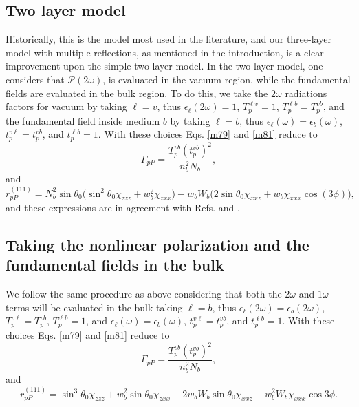 

\subsection{Two layer model}\label{sec:2layer}

Historically, this is the model most used in the literature, and our three-layer
model with multiple reflections, as mentioned in the introduction, is a clear
improvement upon the simple two layer model. In the two layer model, one
considers that $\boldsymbol{\mathcal{P}}(2\omega)$, is evaluated in the vacuum
region, while the fundamental fields are evaluated in the bulk
region.\cite{sipePRB87, mizrahiJOSA88} To do this, we take the $2\omega$
radiations factors for vacuum by taking $\ell=v$, thus
$\epsilon_{\ell}(2\omega)=1$, $T^{\ell v}_{p}=1$, $T^{\ell b}_{p} = T^{vb}_{p}$,
and the fundamental field inside medium $b$ by taking $\ell=b$, thus
$\epsilon_{\ell}(\omega)=\epsilon_{b}(\omega)$, $t^{v\ell}_{p}=t^{vb}_{p}$, and
$t^{\ell b}_{p}=1$. With these choices Eqs. \eqref{m79} and \eqref{m81} reduce
to
\begin{equation}\label{m78}
\Gamma_{pP}
= \frac{T^{v b}_{p}(t^{vb}_{p})^2}
       {n^{2}_{b}N_{b}}, 
\end{equation}
and
\begin{equation}\label{m82}
r^{(111)}_{pP} =
N^{2}_{b}\sin\theta_{0}
\Big(
\sin^2\theta_{0}\chi_{zzz} + w^{2}_{b}\chi_{zxx}
\Big)
- w_{b}W_{b}
\Big(
2\sin\theta_{0}\chi_{xxz} + w_{b}\chi_{xxx}\cos(3\phi)
\Big),
\end{equation}
and these expressions are in agreement with Refs. \cite{sipePRB87} and
\cite{mizrahiJOSA88}.



\subsection{Taking the nonlinear polarization and the fundamental fields in the
bulk}\label{sec:bulk}

We follow the same procedure as above considering that both the $2\omega$ and
$1\omega$ terms will be evaluated in the bulk taking $\ell = b$, thus
$\epsilon_{\ell}(2\omega)=\epsilon_{b}(2\omega)$, $T^{v\ell}_{p}=T^{vb}_{p}$,
$T^{\ell b}_{p} = 1$, and $\epsilon_{\ell}(\omega)=\epsilon_{b}(\omega)$,
$t^{v\ell}_{p} = t^{vb}_{p}$, and $t^{\ell b}_{p} = 1$. With these choices Eqs.
\eqref{m79} and \eqref{m81} reduce to
\begin{equation}
\Gamma_{pP} =
\frac{T_{p}^{vb}\left(t^{vb}_{p}\right)^{2}}
     {n^{2}_{b}N_{b}}, 
\end{equation}
and
\begin{equation}
r^{(111)}_{pP} =
  \sin^{3}\theta_{0}\chi_{zzz}
 + w^{2}_{b}\sin\theta_{0}\chi_{zxx} 
 - 2w_{b}W_{b}\sin\theta_{0}\chi_{xxz}
 - w^{2}_{b}W_{b}\chi_{xxx}\cos3\phi.
\end{equation}

